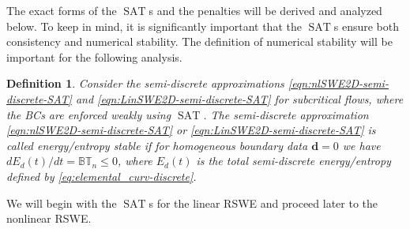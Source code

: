 \documentclass{article}
\numberwithin{equation}{section}
\newtheorem{definition}{Definition}
\theoremstyle{definition}
\begin{document}
The exact forms of the $\operatorname{SAT}$s and the penalties will be derived and analyzed below. To keep in mind, it is significantly important that the $\operatorname{SAT}$s ensure both consistency and numerical stability.
The definition of numerical stability will be important for the following analysis.
\begin{definition}
Consider the semi-discrete approximations \eqref{eqn:nlSWE2D-semi-discrete-SAT} and \eqref{eqn:LinSWE2D-semi-discrete-SAT}
    for subcritical flows, where the BCs are enforced weakly using $\operatorname{SAT}$.  The semi-discrete approximation \eqref{eqn:nlSWE2D-semi-discrete-SAT} or \eqref{eqn:LinSWE2D-semi-discrete-SAT} is called energy/entropy stable if for homogeneous boundary data $\mathbf{d} =0$ we have $dE_d(t)/dt = \mathbb{BT}_n \le 0$, where $E_d(t)$ is the total semi-discrete energy/entropy defined by \eqref{eq:elemental_curv-discrete}.
\end{definition}
We will begin with the $\operatorname{SAT}$s for the linear RSWE and proceed later to  the nonlinear RSWE.
\end{document}
